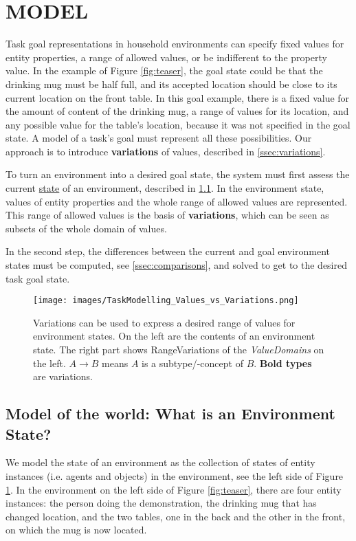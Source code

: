 \section{MODEL}
Task goal representations in household environments can specify fixed values for entity properties, a range of allowed values, or be indifferent to the property value. In the example of Figure \ref{fig:teaser}, the goal state could be that the drinking mug must be half full, and its accepted location should be close to its current location on the front table. In this goal example, there is a fixed value for the amount of content of the drinking mug, a range of values for its location, and any possible value for the table's location, because it was not specified in the goal state. A model of a task's goal must represent all these possibilities. Our approach is to introduce \textbf{variations} of values, described in \ref{ssec:variations}.

To turn an environment into a desired goal state, the system must first assess the current \underline{state} of an environment, described in \ref{ssec:environment_state}. In the environment state, values of entity properties and the whole range of allowed values are represented. This range of allowed values is the basis of \textbf{variations}, which can be seen as subsets of the whole domain of values.

In the second step, the differences between the current and goal environment states must be computed, see \ref{ssec:comparisons}, and solved to get to the desired task goal state.


\begin{figure}[t!]
    \centering
    \texttt{[image: images/TaskModelling\_Values\_vs\_Variations.png]}
    \caption{Variations can be used to express a desired range of values for environment states. On the left are the contents of an environment state. The right part shows RangeVariations of the \textit{ValueDomains} on the left. $A \rightarrow B$ means $A$ is a subtype/-concept of $B$. \textbf{Bold types} are variations.} \label{fig:objects_and_tasks_domain}
\end{figure}

\subsection{Model of the world: What is an Environment State?}\label{ssec:environment_state}
We model the state of an environment as the collection of states of entity instances (i.e. agents and objects) in the environment, see the left side of Figure \ref{fig:objects_and_tasks_domain}. In the environment on the left side of Figure \ref{fig:teaser}, there are four entity instances: the person doing the demonstration, the drinking mug that has changed location, and the two tables, one in the back and the other in the front, on which the mug is now located.

